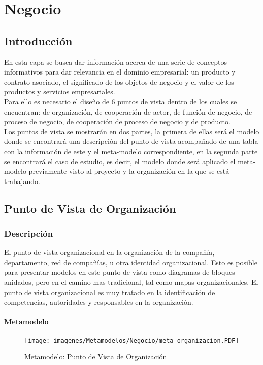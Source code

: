\chapter{Negocio}

\section{Introducción}
En esta capa se busca dar información acerca de una serie  de conceptos informativos para dar relevancia  en el dominio empresarial: un producto y contrato asociado, el significado de los objetos de negocio y el valor de los productos y servicios empresariales.\\
Para ello es necesario el diseño de 6 puntos de vista dentro de los cuales se encuentran: de organización, de cooperación de actor, de función de negocio, de proceso de negocio, de cooperación de proceso de negocio y de producto.\\
Los puntos de vista se mostrarán en dos partes, la primera de ellas será el modelo donde se encontrará una descripción del punto de vista acompañado de una tabla con la información de este y el meta-modelo correspondiente, en la segunda parte se encontrará el caso de estudio, es decir, el modelo donde será aplicado el meta-modelo previamente visto al proyecto y la organización en la que se está trabajando.
\newpage

\section{Punto de Vista de Organización}
\subsection{Descripción}
El punto de vista organizacional en la organización de la compañía, departamento, red de compañías, u otra identidad organizacional. Esto es posible para presentar modelos en este punto de vista como diagramas de bloques anidados, pero en el camino mas tradicional, tal como mapas organizacionales. El punto de vista organizacional es muy tratado en 	la identificación de competencias, autoridades y responsables en la organización.

\subsubsection{Metamodelo}
\begin{figure}[h]
	\centering
	\texttt{[image: imagenes/Metamodelos/Negocio/meta\_organizacion.PDF]}
	\caption{Metamodelo: Punto de Vista de Organización}
	\label{fig:gap_analysis}
\end{figure}

